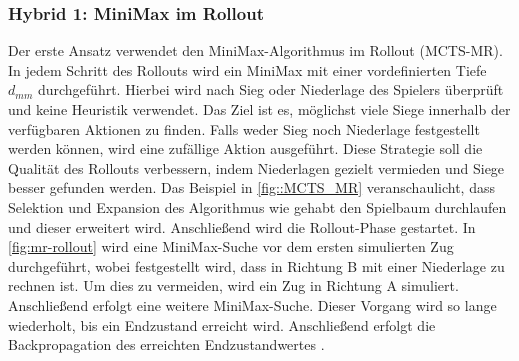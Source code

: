 \documentclass[12pt,a4paper,bibliography=totocnumbered,listof=totocnumbered]{article}
\begin{document}
\subsubsection{Hybrid 1: MiniMax im Rollout}
Der erste Ansatz verwendet den MiniMax-Algorithmus im Rollout (MCTS-MR). In jedem Schritt des Rollouts wird ein MiniMax mit einer vordefinierten Tiefe $d_{mm}$ durchgeführt. Hierbei wird nach Sieg oder Niederlage des Spielers überprüft und keine Heuristik verwendet. Das Ziel ist es, möglichst viele Siege innerhalb der verfügbaren Aktionen zu finden. Falls weder Sieg noch Niederlage festgestellt werden können, wird eine zufällige Aktion ausgeführt. Diese Strategie soll die Qualität des Rollouts verbessern, indem Niederlagen gezielt vermieden und Siege besser gefunden werden. Das Beispiel in \autoref{fig::MCTS_MR} veranschaulicht, dass Selektion und Expansion des Algorithmus wie gehabt den Spielbaum durchlaufen und dieser erweitert wird. Anschließend wird die Rollout-Phase gestartet. In \autoref{fig:mr-rollout} wird eine MiniMax-Suche vor dem ersten simulierten Zug durchgeführt, wobei festgestellt wird, dass in Richtung B mit einer Niederlage zu rechnen ist. Um dies zu vermeiden, wird ein Zug in Richtung A simuliert. Anschließend erfolgt eine weitere MiniMax-Suche. Dieser Vorgang wird so lange wiederholt, bis ein Endzustand erreicht wird. Anschließend erfolgt die Backpropagation des erreichten Endzustandwertes \citep{Baier.2015}.
\end{document}
